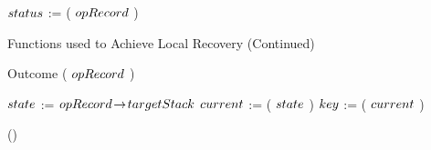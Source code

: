 \begin{limitscope}
\begin{algorithm}[tb]
{{			
		  $\status$ := \ExamineTop( $opRecord$ )\;
			
			\lIf{$\status$ $\in$ \{ \STOPFOUND{}, \STOPNOTFOUND{} \}}
			{
			   \Return \False
			}
			
			\label{lin:local-find|start|point:while:end}
	 }
	
	 \OptReturn[\False]
	 \label{lin:local-find|start|point:end}
}
\end{algorithm}
\begin{algorithm}[tb]
\caption{Functions used to Achieve Local Recovery  (Continued)} 
\label{algo:local-local:recovery|2}
\DefineKeyWords
{}
\DontPrintSemicolon
\Enum Outcome \ExamineTop( $opRecord$ )\;
\PrintSemicolon
\label{lin:local-examine|top:begin}
\Begin
{
   $state$ := $opRecord \!\rightarrow\! targetStack$\;
	 $current$ := \GetTop( $state$ )\;
	 $\cKey$ := \GetKey( $current$ )\;
	 \BlankLine
	 \uIf{$\opRecord \rarrow \key$ $>$ $\cKey$} 
	 {   
			 \Return \DONOTKNOW\;
			 \label{lin:local-examine|top:continue|1}
	 } 
	 \uElseIf{$\opRecord \rarrow \key$ $<$ $\cKey$}
	 {  
	    \label{lin:local-examine|top:inconsistent}
	    \lIf{$\opRecord \rarrow \type$ = \INSERT}
			{
			   \Return \DONOTKNOW
				 \label{lin:local-examine|top:continue|2}
			}
			\lElse
			{
			   \Return \STOPNOTFOUND
			}
	
	 }
	 \Else()
	 {
	    \label{lin:local-examine|top:matching}
	    
	    \Return \STOPFOUND\;
	 }
	
	 \OptReturn[\DONOTKNOW]
	 \label{lin:local-examine|top:end}
}
\end{algorithm}













\end{limitscope}
